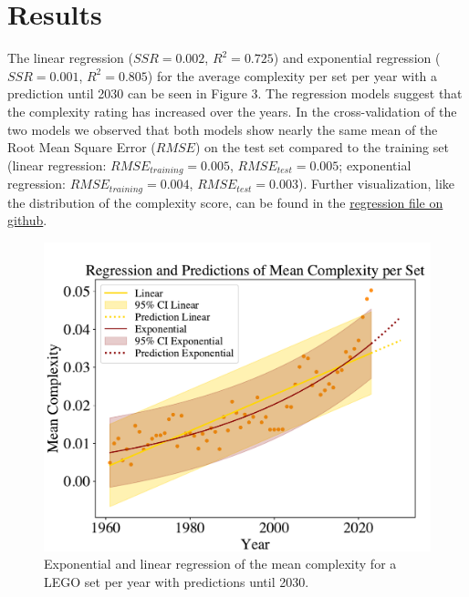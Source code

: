 \documentclass{article}
\theoremstyle{plain}
\theoremstyle{definition}
\theoremstyle{remark}
\begin{document}
\section{Results}\label{sec:results}
The linear regression ($SSR = 0.002$, $R^2= 0.725$) and exponential regression ($SSR = 0.001$, $R^2= 0.805$) for the average complexity per set per year with a prediction until 2030 can be seen in Figure 3. The regression models suggest that the complexity rating has increased over the years. In the cross-validation of the two models we observed that both models show nearly the same mean of the Root Mean Square Error ($RMSE$) on the test set compared to the training set (linear regression: $RMSE_{training} = 0.005$, $RMSE_{test} = 0.005$; exponential regression: $RMSE_{training} = 0.004$, $RMSE_{test} = 0.003$). Further visualization, like the distribution of the complexity score, can be found in the \href{https://github.com/eddiebeach99/Data_Literacy/blob/main/Analysis/complexity_regression.ipynb}{regression file on github}.\\
\begin{figure}[H]
\vskip 0.2in
 \begin{center}
 \centerline{\includegraphics[width=\columnwidth]{../Images/Regressions.pdf}}
\caption{Exponential and linear regression of the mean complexity for a LEGO set per year with predictions until 2030.}
\label{icml-historical}
 \end{center}
\vskip -0.2in
\end{figure}
\end{document}
